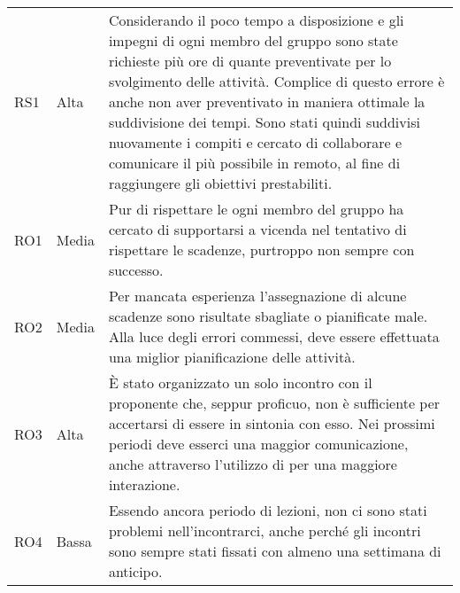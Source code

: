 {\begin{longtable}{C{2cm} C{3cm} C{10cm}}
RS1 &
Alta &
Considerando il poco tempo a disposizione e gli impegni di ogni membro del gruppo sono state richieste più ore di quante preventivate per lo svolgimento delle attività. Complice di questo errore è anche non aver preventivato in maniera ottimale la suddivisione dei tempi. Sono stati quindi suddivisi nuovamente i compiti e cercato di collaborare e comunicare il più possibile in remoto, al fine di raggiungere gli obiettivi prestabiliti. \\

RO1 &
Media &
Pur di rispettare le  ogni membro del gruppo ha cercato di supportarsi a vicenda nel tentativo di rispettare le scadenze, purtroppo non sempre con successo. \\

RO2 &
Media &
Per mancata esperienza l'assegnazione di alcune scadenze sono risultate sbagliate o pianificate male. Alla luce degli errori commessi, deve essere effettuata una miglior pianificazione delle attività. \\

RO3 &
Alta &
È stato organizzato un solo incontro con il proponente che, seppur proficuo, non è sufficiente per accertarsi di essere in sintonia con esso. Nei prossimi periodi deve esserci una maggior comunicazione, anche attraverso l'utilizzo di  per una maggiore interazione. \\

RO4 &
Bassa &
Essendo ancora periodo di lezioni, non ci sono stati problemi nell'incontrarci, anche perché gli incontri sono sempre stati fissati con almeno una settimana di anticipo. \\

\end{longtable}	
}

